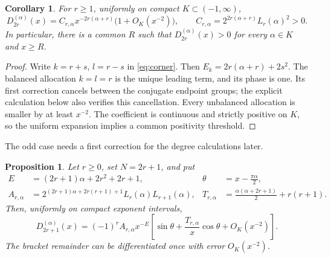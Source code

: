 \documentclass[11pt]{article}
\numberwithin{equation}{section}
\newtheorem{proposition}[theorem]{Proposition}
\newtheorem{corollary}[theorem]{Corollary}
\theoremstyle{remark}
\begin{document}
\begin{corollary}\label{cor:eventail}
For $r\ge1$, uniformly on compact $K\subset(-1,\infty)$,
\begin{equation}\label{eq:eventail}
 D_{2r}^{(\alpha)}(x)=C_{r,\alpha}
 x^{-2r(\alpha+r)}\bigl(1+O_K(x^{-2})\bigr),
 \qquad
 C_{r,\alpha}=2^{2r(\alpha+r)}L_r(\alpha)^2>0.
\end{equation}
In particular, there is a common $R$ such that
$D_{2r}^{(\alpha)}(x)>0$ for every $\alpha\in K$ and $x\ge R$.
\end{corollary}

\begin{proof}
Write $k=r+s$, $l=r-s$ in \eqref{eq:corner}. Then
$E_k=2r(\alpha+r)+2s^2$. The balanced allocation $k=l=r$ is the
unique leading term, and its phase is one. Its first correction
cancels between the conjugate endpoint groups; the explicit calculation
below also verifies this cancellation. Every unbalanced allocation is
smaller by at least $x^{-2}$. The coefficient is continuous and strictly
positive on $K$, so the uniform expansion implies a common positivity
threshold.
\end{proof}

The odd case needs a first correction for the degree calculations later.

\begin{proposition}\label{prop:oddexpansion}
Let $r\ge0$, set $N=2r+1$, and put
\begin{align}
 E&=(2r+1)\alpha+2r^2+2r+1,&
 \theta&=x-\frac{\pi\alpha}{2},\label{eq:oddparameters}\\
 A_{r,\alpha}&=2^{(2r+1)\alpha+2r(r+1)+1}
                  L_r(\alpha)L_{r+1}(\alpha),&
 T_{r,\alpha}&=\frac{\alpha(\alpha+2r+1)}2+r(r+1).
 \label{eq:oddconstants}
\end{align}
Then, uniformly on compact exponent intervals,
\begin{equation}\label{eq:oddexpansion}
 D_{2r+1}^{(\alpha)}(x)=(-1)^r A_{r,\alpha}x^{-E}
 \left[\sin\theta+\frac{T_{r,\alpha}}x\cos\theta+O_K(x^{-2})\right].
\end{equation}
The bracket remainder can be differentiated once with error
$O_K(x^{-2})$.
\end{proposition}
\end{document}
